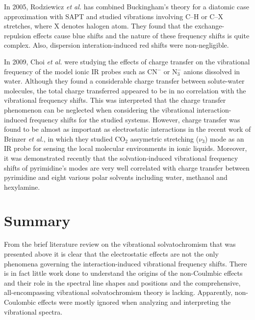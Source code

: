 \documentclass[a4paper,titlepage,twoside,fleqn,12pt]{book}
\begin{document}
\begin{refsection}
In 2005, Rodziewicz \emph{et al.} has combined Buckingham's theory for a diatomic case approximation with SAPT 
and studied vibrations involving C--H or C--X
stretches, where X denotes halogen atom.\citep{Rodziewicz.Rutkowski.Melikova.Koll.ChemPhysChem.2005} 
They found that the exchange\hyp{}repulsion effects
cause blue shifts and the nature of these frequency shifts is quite complex. Also, dispersion
interation\hyp{}induced red shifts were non\hyp{}negligible. 

In 2009, Choi \emph{et al.} were studying the effects of charge transfer on the vibrational
frequency of the model ionic IR probes such as CN$^-$ or N$_3^-$ anions dissolved in water.\citep{Lee.Choi.Cho.PCCP.2010}
Although they found a considerable charge
transfer between solute\hyp{}water molecules, the total charge transferred appeared to be in no
correlation with the vibrational frequency shifts. This was interpreted that the charge transfer 
phenomenon can be neglected when considering the vibrational interaction\hyp{}induced frequency shifts
for the studied systems. However, charge transfer was found to be almost as important as electrostatic
interactions in the 
recent work of Brinzer \emph{et al.},\citep{Brinzer.Berquist.Zhe.Dutta.Johnson.Krisher.Lambrecht.Garrett-Roe.JCP.2015} 
in which they studied CO$_2$ assymetric
stretching ($\nu_3$) mode as an IR probe for sensing the local molecular environments in ionic
liquids. Moreover, it was demonstrated recently that the solvation\hyp{}induced vibrational
frequency shifts of pyrimidine's modes are very well correlated with charge transfer between
pyrimidine and eight various polar solvents including water, methanol
and hexylamine.\citep{Wright.Howard.Howard.Tschumper.Hammer.JPCA.2013}

\section{Summary}

From the brief literature review on the vibrational solvatochromism
that was presented above it is clear that the electrostatic effects
are not the only phenomena governing the interaction\hyp{}induced 
vibrational frequency shifts. There is in fact little work done
to understand the origins of the non\hyp{}Coulmbic effects and their
role in the spectral line shapes and positions and the comprehensive,
all\hyp{}encompassing vibrational solvatochromism theory is lacking. Apparently,
non\hyp{}Coulombic effects were mostly ignored when analyzing and interpreting
the vibrational spectra.


\end{refsection}
\end{document}
